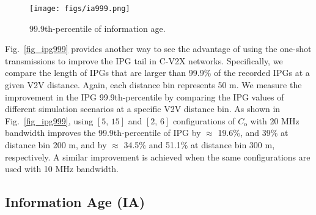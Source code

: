 \documentclass[conference]{IEEEtran}
\begin{document}
\begin{figure}
  \begin{center}
  \texttt{[image: figs/ia999.png]}
  \caption{99.9th-percentile of information age.}\label{fig_ia999}
  \vspace{-.25in}
  \end{center}
\end{figure}

Fig.~\ref{fig_ipg999} provides another way to see the advantage of using the one-shot transmissions to improve the IPG tail in C-V2X networks. Specifically, we compare the length of IPGs that are larger than 99.9\% of the recorded IPGs at a given V2V distance. Again, each distance bin represents 50 m. We measure the improvement in the IPG 99.9th-percentile by comparing the IPG values of different simulation scenarios at a specific V2V distance bin. As shown in Fig.~\ref{fig_ipg999}, using $[5,\,15]$ and $[2,\,6]$ configurations of $C_{\mathrm{o}}$ with 20 MHz bandwidth improves the 99.9th-percentile of IPG by $\approx$ 19.6\%, and 39\% at distance bin 200 m, and by $\approx$ 34.5\% and 51.1\% at distance bin 300 m, respectively. A similar improvement is achieved when the same configurations are used with 10 MHz bandwidth. 

\subsection{Information Age (IA)}\label{sec_sub_ia}
\end{document}
